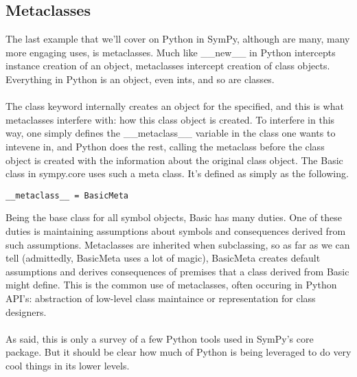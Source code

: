 \documentclass[11pt,a4paper,oneside]{report}
\begin{document}
\subsection*{\small Metaclasses}
The last example that we'll cover on Python in SymPy, although are many, many more engaging uses, is metaclasses. Much like \_\_new\_\_ in Python intercepts instance creation of an object, metaclasses intercept creation of class objects. Everything in Python is an object, even ints, and so are classes.\\\\
 The class keyword internally creates an object for the specified, and this is what metaclasses interfere with: how this class object is created. To interfere in this way, one simply defines the \_\_metaclass\_\_ variable in the class one wants to intevene in, and Python does the rest, calling the metaclass before the class object is created with the information about the original class object. The Basic class in sympy.core uses such a meta class. It's defined as simply as the following.
\begin{verbatim}
__metaclass__ = BasicMeta
\end{verbatim}
Being the base class for all symbol objects, Basic has many duties. One of these duties is maintaining assumptions about symbols and consequences derived from such assumptions. Metaclasses are inherited when subclassing, so as far as we can tell (admittedly, BasicMeta uses a lot of magic), BasicMeta creates default assumptions and derives consequences of premises that a class derived from Basic might define. This is the common use of metaclasses, often occuring in Python API's: abstraction of low-level class maintaince or representation for class designers.\\\\
As said, this is only a survey of a few Python tools used in SymPy's core package. But it should be clear how much of Python is being leveraged to do very cool things in its lower levels.
\end{document}
